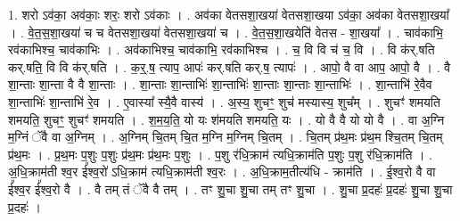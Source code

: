 \documentclass[17pt]{extarticle}
\begin{document}
1. शरो ऽव॑का॒ अव॑काः॒ शरः॒ शरो ऽव॑काः । . अव॑का वेतसशा॒खया॑ वेतसशा॒खया ऽव॑का॒ अव॑का वेतसशा॒खया᳚ । . वे॒त॒स॒शा॒खया॑ च च वेतसशा॒खया॑ वेतसशा॒खया॑ च । . वे॒त॒स॒शा॒खयेति॑ वेतस - शा॒खया᳚ । . चाव॑काभि॒ रव॑काभिश्च॒ चाव॑काभिः । . अव॑काभिश्च॒ चाव॑काभि॒ रव॑काभिश्च । . च॒ वि वि च॑ च॒ वि । . वि क॑र्.षति कर्.षति॒ वि वि क॑र्.षति । . क॒र्॒.ष॒ त्याप॒ आपः॑ कर्.षति कर्.ष॒ त्यापः॑ । . आपो॒ वै वा आप॒ आपो॒ वै । . वै शा॒न्ताः शा॒न्ता वै वै शा॒न्ताः । . शा॒न्ताः शा॒न्ताभिः॑ शा॒न्ताभिः॑ शा॒न्ताः शा॒न्ताः शा॒न्ताभिः॑ । . शा॒न्ताभि॑ रे॒वैव शा॒न्ताभिः॑ शा॒न्ताभि॑ रे॒व । . ए॒वास्या᳚ स्यै॒वै वास्य॑ । . अ॒स्य॒ शुचꣳ॒॒ शुच॑ मस्यास्य॒ शुच᳚म् । . शुचꣳ॑ शमयति शमयति॒ शुचꣳ॒॒ शुचꣳ॑ शमयति । . श॒म॒य॒ति॒ यो यः श॑मयति शमयति॒ यः । . यो वै वै यो यो वै । . वा अ॒ग्नि म॒ग्निं ॅवै वा अ॒ग्निम् । . अ॒ग्निम् चि॒तम् चि॒त म॒ग्नि म॒ग्निम् चि॒तम् । . चि॒तम् प्र॑थ॒मः प्र॑थ॒म श्चि॒तम् चि॒तम् प्र॑थ॒मः । . प्र॒थ॒मः प॒शुः प॒शुः प्र॑थ॒मः प्र॑थ॒मः प॒शुः । . प॒शु र॑धि॒क्राम॑ त्यधि॒क्राम॑ति प॒शुः प॒शु र॑धि॒क्राम॑ति । . अ॒धि॒क्राम॑ती श्व॒र ई᳚श्व॒रो॑ ऽधि॒क्राम॑ त्यधि॒क्राम॑ती श्व॒रः । . अ॒धि॒क्राम॒तीत्य॑धि - क्राम॑ति । . ई॒श्व॒रो वै वा ई᳚श्व॒र ई᳚श्व॒रो वै । . वै तम् तं ॅवै वै तम् । . तꣳ शु॒चा शु॒चा तम् तꣳ शु॒चा । . शु॒चा प्र॒दहः॑ प्र॒दहः॑ शु॒चा शु॒चा प्र॒दहः॑ । \newline
\end{document}
